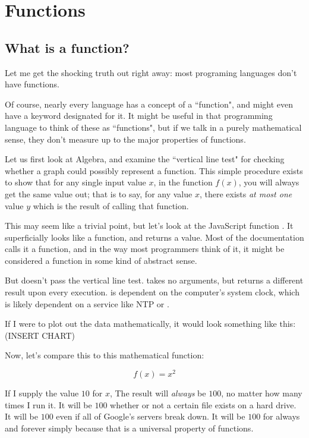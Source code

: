 \chapter{Functions}
\section{What is a function?}
Let me get the shocking truth out right away: most programing languages don't have functions.  

Of course, nearly every language has a concept of a ``function", and might even have a keyword designated for it. It might be useful in that programming language to think of these as ``functions", but if we talk in a purely mathematical sense, they don't measure up to the major properties of functions.  

Let us first look at Algebra, and examine the ``vertical line test" for checking whether a graph could possibly represent a function. This simple procedure exists to show that for any single input value $ x $, in the function $f\left(x\right)$, you will always get the same value out; that is to say, for any value $ x $, there exists \textit{at most one} value $ y $ which is the result of calling that function. 

This may seem like a trivial point, but let's look at the JavaScript function .  It superficially looks like a function, and returns a value.  Most of the documentation calls it a function, and in the way most programmers think of it, it might be considered a function in some kind of abstract sense. 

But  doesn't pass the vertical line test.  takes no arguments, but returns a different result upon every execution.   is dependent on the computer's system clock, which is likely dependent on a service like NTP or . 

If I were to plot out the data mathematically, it would look something like this: (INSERT CHART)

Now, let's compare this to this mathematical function: 

$$ f\left( x \right) = x ^ 2 $$ 

If I supply the value $ 10 $ for $ x $, The result will \textit{always} be $ 100 $, no matter how many times I run it.  It will be $ 100 $ whether or not a certain file exists on a hard drive. It will be $100$ even if all of Google's servers break down.  It will be $100$ for always and forever simply because that is a universal property of functions. 

